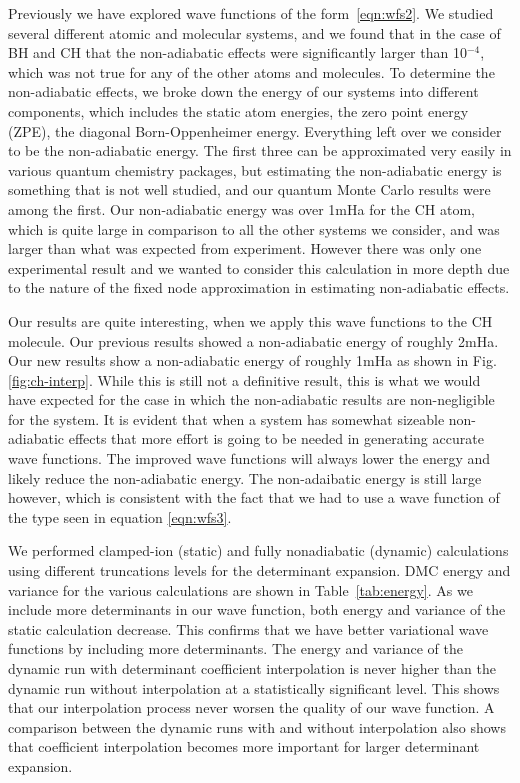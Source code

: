 \documentclass[aip,jcp,numerical,reprint]{revtex4-1}
\begin{document}
Previously we have explored wave functions of the form~\eqref{eqn:wfs2}.  We studied several different atomic and molecular systems, and we found that in the case of BH and CH that the non-adiabatic effects were  significantly larger than 10$^{-4}$, which was not true for any of the other atoms and molecules.  To determine the non-adiabatic effects, we broke down the energy of our systems into different components, which includes the static atom energies, the zero point energy (ZPE), the diagonal Born-Oppenheimer energy.   Everything left over we consider to be the non-adiabatic energy.   The first three can be approximated very easily in various quantum chemistry packages, but estimating the non-adiabatic energy is something that is not well studied, and our quantum Monte Carlo results were among the first.  Our non-adiabatic energy was over 1mHa for the CH atom, which is quite large in comparison to all the other systems we consider, and was larger than what was expected from experiment.  However there was only one experimental result and we wanted to consider this calculation in more depth due to the nature of the fixed node approximation in estimating non-adiabatic effects.

Our results are quite interesting, when we apply this wave functions to the CH molecule.  Our previous results showed a non-adiabatic energy of roughly 2mHa. Our new results show a non-adiabatic energy of roughly 1mHa as shown in Fig.\ref{fig:ch-interp}.  While this is still not a definitive result, this is what we would have expected for the case in which the non-adiabatic results are non-negligible for the system.  It is evident that when a system has somewhat sizeable non-adiabatic effects that more effort is going to be needed in generating accurate wave functions.  The improved wave functions will always lower the energy and likely reduce the non-adiabatic energy.  The non-adaibatic energy is still large however, which is consistent with the fact that we had to use a wave function of the type seen in equation \eqref{eqn:wfs3}.

We performed clamped-ion (static) and fully nonadiabatic (dynamic) calculations using different truncations levels for the determinant expansion. DMC energy and variance for the various calculations are shown in Table~\ref{tab:energy}. As we include more determinants in our wave function, both energy and variance of the static calculation decrease. This confirms that we have better variational wave functions by including more determinants. The energy and variance of the dynamic run with determinant coefficient interpolation is never higher than the dynamic run without interpolation at a statistically significant level. This shows that our interpolation process never worsen the quality of our wave function. A comparison between the dynamic runs with and without interpolation also shows that coefficient interpolation becomes more important for larger determinant expansion.
\end{document}
